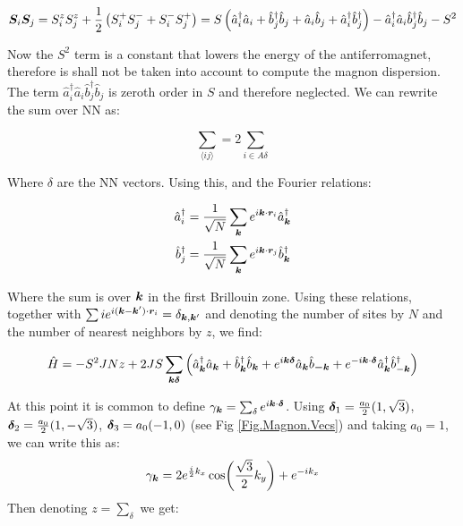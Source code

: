 \begin{align*}
\boldsymbol{S}_i\boldsymbol{S}_j = S_i^zS_j^z + \frac{1}{2}\left(S_i^+S_j^- + S_i^-S_j^+ \right) = S \left( \hat{a}^\dagger_i \hat{a}_i + \hat{b}^\dagger_j \hat{b}_j + \hat{a}_i\hat{b}_j + \hat{a}^\dagger_i\hat{b}^\dagger_j \right) - \hat{a}^\dagger_i \hat{a}_i\hat{b}^\dagger_j \hat{b}_j - S^2
\end{align*}

Now the $S^2$ term is a constant that lowers the energy of the antiferromagnet, therefore is shall not be taken into account to compute the magnon dispersion. The term $\hat{a}^\dagger_i \hat{a}_i\hat{b}^\dagger_j \hat{b}_j$ is zeroth order in $S$ and therefore neglected. We can rewrite the sum over NN as:

\begin{equation}
\sum_{\langle i j \rangle} = 2\sum_{i \in A \delta}
\end{equation}

Where $\delta$ are the NN vectors. Using this, and the Fourier relations:

\begin{align}
\hat{a}_i^\dagger &= \frac{1}{\sqrt{N}} \sum_{\boldsymbol{k}} e^{i \boldsymbol{k} \cdot \boldsymbol{r}_i} \hat{a}_{\boldsymbol{k}}^\dagger \\
\hat{b}_j^\dagger &= \frac{1}{\sqrt{N}} \sum_{\boldsymbol{k}} e^{i \boldsymbol{k} \cdot \boldsymbol{r}_j} \hat{b}_{\boldsymbol{k}}^\dagger
\end{align}

Where the sum is over $\boldsymbol{k}$ in the first Brillouin zone. Using these relations, together with $\sum{i} e^{i(\boldsymbol{k}-\boldsymbol{k}')\cdot\boldsymbol{r}_i} = \delta_{\boldsymbol{k}, \boldsymbol{k}'}$ and denoting the number of sites by $N$ and the number of nearest neighbors by $z$, we find:

\begin{equation}
\hat{H} = -S^2JNz + 2JS \sum_{\boldsymbol{k} \boldsymbol{\delta}} \left( \hat{a}^\dagger_{\boldsymbol{k}}\hat{a}_{\boldsymbol{k}} + \hat{b}^\dagger_{\boldsymbol{k}}\hat{b}_{\boldsymbol{k}} + e^{i\boldsymbol{k}\boldsymbol{\delta}}\hat{a}_{\boldsymbol{k}}\hat{b}_{\boldsymbol{-k}} + e^{-i \boldsymbol{k}\cdot\boldsymbol{\delta}}  \hat{a}^\dagger_{\boldsymbol{k}}\hat{b}^\dagger_{-\boldsymbol{k}} \right)
\end{equation}

At this point it is common to define $\gamma_{\boldsymbol{k}} = \sum_\delta e^{i \boldsymbol{k} \cdot \boldsymbol{\delta}}$. Using $\boldsymbol{\delta}_1=\frac{a_0}{2}(1,\sqrt{3})$, $\boldsymbol{\delta}_2=\frac{a_0}{2}(1,-\sqrt{3})$, $\boldsymbol{\delta}_3=a_0(-1,0)$ (see Fig \ref{Fig.Magnon.Vecs}) and taking $a_0=1$, we can write this as:
\begin{equation}
\gamma_{\boldsymbol{k}} = 2e^{\frac{i}{2}k_x}\cos(\frac{\sqrt{3}}{2}k_y)+e^{-ik_x}
\end{equation}
Then denoting $z = \sum_\delta$ we get:

